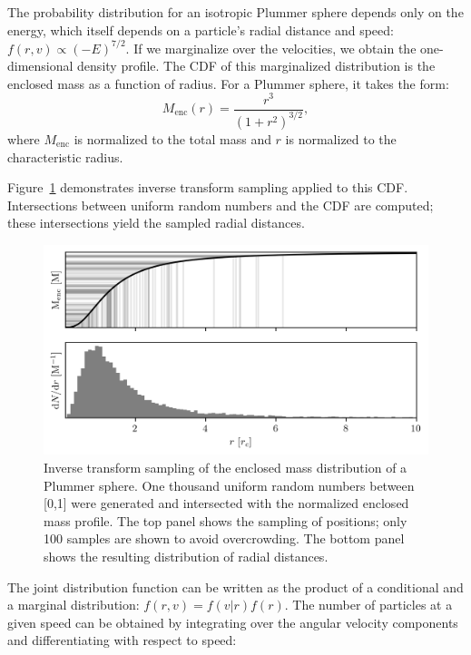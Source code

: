             The probability distribution for an isotropic Plummer sphere depends only on the energy, which itself depends on a particle's radial distance and speed: $f(r,v) \propto (-E)^{7/2}$. If we marginalize over the velocities, we obtain the one-dimensional density profile. The CDF of this marginalized distribution is the enclosed mass as a function of radius. For a Plummer sphere, it takes the form:
            \begin{equation}
                M_{\mathrm{enc}}(r) = \frac{r^3}{\left(1 + r^2\right)^{3/2}},
            \end{equation}
            where $M_{\mathrm{enc}}$ is normalized to the total mass and $r$ is normalized to the characteristic radius.

            Figure~\ref{fig:inverse_transform_sampling_distances} demonstrates inverse transform sampling applied to this CDF. Intersections between uniform random numbers and the CDF are computed; these intersections yield the sampled radial distances.
            \begin{figure}
                \includegraphics[width=\linewidth]{images/inverse_transform_sampling_distances.png}
                \caption{Inverse transform sampling of the enclosed mass distribution of a Plummer sphere. One thousand uniform random numbers between [0,1] were generated and intersected with the normalized enclosed mass profile. The top panel shows the sampling of positions; only 100 samples are shown to avoid overcrowding. The bottom panel shows the resulting distribution of radial distances.}
                \label{fig:inverse_transform_sampling_distances}
            \end{figure}
            The joint distribution function can be written as the product of a conditional and a marginal distribution: $f(r,v) = f(v|r) f(r)$. The number of particles at a given speed can be obtained by integrating over the angular velocity components and differentiating with respect to speed:
